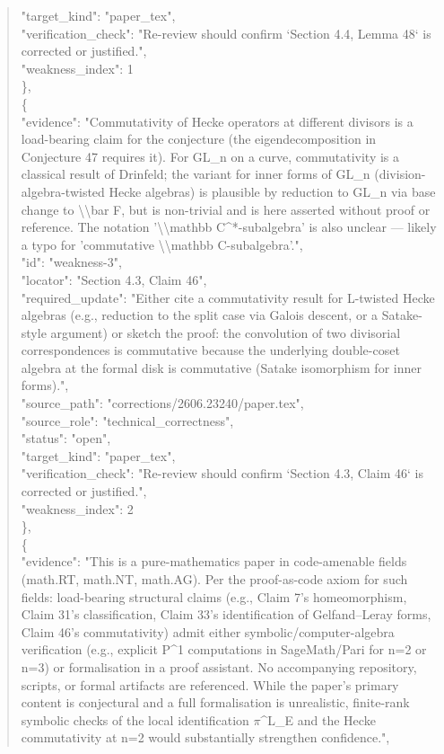 \documentclass[11pt]{article}
\begin{document}
\begin{quote}
      "target\_kind": "paper\_tex",\\
      "verification\_check": "Re-review should confirm `Section 4.4, Lemma 48` is corrected or justified.",\\
      "weakness\_index": 1\\
    \},\\
    \{\\
      "evidence": "Commutativity of Hecke operators at different divisors is a load-bearing claim for the conjecture (the eigendecomposition in Conjecture 47 requires it). For GL\_n on a curve, commutativity is a classical result of Drinfeld; the variant for inner forms of GL\_n (division-algebra-twisted Hecke algebras) is plausible by reduction to GL\_n via base change to \textbackslash{}\textbackslash{}bar F, but is non-trivial and is here asserted without proof or reference. The notation '\textbackslash{}\textbackslash{}mathbb C\^{}*-subalgebra' is also unclear --- likely a typo for 'commutative \textbackslash{}\textbackslash{}mathbb C-subalgebra'.",\\
      "id": "weakness-3",\\
      "locator": "Section 4.3, Claim 46",\\
      "required\_update": "Either cite a commutativity result for L-twisted Hecke algebras (e.g., reduction to the split case via Galois descent, or a Satake-style argument) or sketch the proof: the convolution of two divisorial correspondences is commutative because the underlying double-coset algebra at the formal disk is commutative (Satake isomorphism for inner forms).",\\
      "source\_path": "corrections/2606.23240/paper.tex",\\
      "source\_role": "technical\_correctness",\\
      "status": "open",\\
      "target\_kind": "paper\_tex",\\
      "verification\_check": "Re-review should confirm `Section 4.3, Claim 46` is corrected or justified.",\\
      "weakness\_index": 2\\
    \},\\
    \{\\
      "evidence": "This is a pure-mathematics paper in code-amenable fields (math.RT, math.NT, math.AG). Per the proof-as-code axiom for such fields: load-bearing structural claims (e.g., Claim 7's homeomorphism, Claim 31's classification, Claim 33's identification of Gelfand--Leray forms, Claim 46's commutativity) admit either symbolic/computer-algebra verification (e.g., explicit P\^{}1 computations in SageMath/Pari for n=2 or n=3) or formalisation in a proof assistant. No accompanying repository, scripts, or formal artifacts are referenced. While the paper's primary content is conjectural and a full formalisation is unrealistic, finite-rank symbolic checks of the local identification \ensuremath{\pi}\^{}L\_E and the Hecke commutativity at n=2 would substantially strengthen confidence.",\\

\end{quote}
\end{document}
